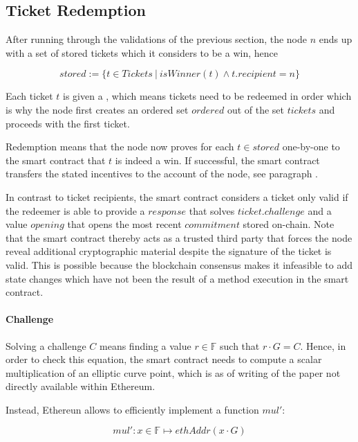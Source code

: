 \subsection{Ticket Redemption}
\label{sec:tickets:redemption}

After running through the validations of the previous section, the node $n$ ends up with a set of stored tickets which it considers to be a win, hence

$$ stored := \{ t \in Tickets \ | \ isWinner(t) \land t.recipient = n \}$$

Each ticket $t$ is given a  , which means tickets need to be redeemed in order which is why the node first creates an ordered set $ordered$ out of the set $tickets$ and proceeds with the first ticket.

Redemption means that the node now proves for each $t \in stored$ one-by-one to the smart contract that $t$ is indeed a win. If successful, the smart contract transfers the stated incentives to the account of the node, see paragraph .

In contrast to ticket recipients, the smart contract considers a ticket only valid if the redeemer is able to provide a $response$ that solves $ticket.challenge$ and a value $opening$ that opens the most recent $commitment$ stored on-chain. Note that the smart contract thereby acts as a trusted third party that forces the node reveal additional cryptographic material despite the signature of the ticket is valid. This is possible because the blockchain consensus makes it infeasible to add state changes which have not been the result of a method execution in the smart contract.

\paragraph{Challenge}
\label{sec:tickets:redemption:challenge}

Solving a challenge $C$ means finding a value $r \in \mathbb{F}$ such that $r \cdot G =C$. Hence, in order to check this equation, the smart contract needs to compute a scalar multiplication of an elliptic curve point, which is as of writing of the paper not directly available within Ethereum.

Instead, Ethereun allows to efficiently implement a function $mul'$:

$$ mul': x \in \mathbb{F} \mapsto ethAddr (x \cdot G)$$

